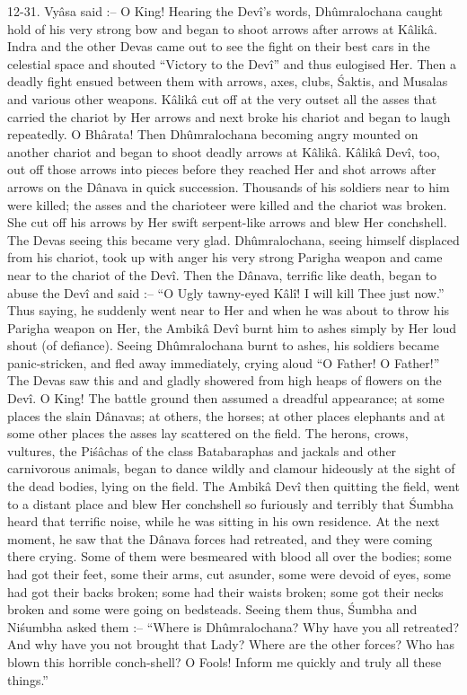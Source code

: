 12-31. Vy\^asa said :-- O King! Hearing the Dev\^i's words, Dh\^umralochana caught hold of his very strong bow and began to shoot arrows after arrows at K\^alik\^a. Indra and the other Devas came out to see the fight on their best cars in the celestial space and shouted ``Victory to the Dev\^i'' and thus eulogised Her. Then a deadly fight ensued between them with arrows, axes, clubs, \'Saktis, and Musalas and various other weapons. K\^alik\^a cut off at the very outset all the asses that carried the chariot by Her arrows and next broke his chariot and began to laugh repeatedly. O Bh\^arata! Then Dh\^umralochana becoming angry mounted on another chariot and began to shoot deadly arrows at K\^alik\^a. K\^alik\^a Dev\^i, too, out off those arrows into pieces before they reached Her and shot arrows after arrows on the D\^anava in quick succession. Thousands of his soldiers near to him were killed; the asses and the charioteer were killed and the chariot was broken. She cut off his arrows by Her swift serpent-like arrows and blew Her conchshell. The Devas seeing this became very glad. Dh\^umralochana, seeing himself displaced from his chariot, took up with anger his very strong Parigha weapon and came near to the chariot of the Dev\^i. Then the D\^anava, terrific like death, began to abuse the Dev\^i and said :-- ``O Ugly tawny-eyed K\^al\^i! I will kill Thee just now.'' Thus saying, he suddenly went near to Her and when he was about to throw his Parigha weapon on Her, the Ambik\^a Dev\^i burnt him to ashes simply by Her loud shout (of defiance). Seeing Dh\^umralochana burnt to ashes, his soldiers became panic-stricken, and fled away immediately, crying aloud ``O Father! O Father!'' The Devas saw this and and gladly showered from high heaps of flowers on the Dev\^i. O King! The battle ground then assumed a dreadful appearance; at some places the slain D\^anavas; at others, the horses; at other places elephants and at some other places the asses lay scattered on the field. The herons, crows, vultures, the Pi\'s\^achas of the class Batabaraphas and jackals and other carnivorous animals, began to dance wildly and clamour hideously at the sight of the dead bodies, lying on the field. The Ambik\^a Dev\^i then quitting the field, went to a distant place and blew Her conchshell so furiously and terribly that \'Sumbha heard that terrific noise, while he was sitting in his own residence. At the next moment, he saw that the D\^anava forces had retreated, and they were coming there crying. Some of them were besmeared with blood all over the bodies; some had got their feet, some their arms, cut asunder, some were devoid of eyes, some had got their backs broken; some had their waists broken; some got their necks broken and some were going on bedsteads. Seeing them thus, \'Sumbha and Ni\'sumbha asked them :-- ``Where is Dh\^umralochana? Why have you all retreated? And why have you not brought that Lady? Where are the other forces? Who has blown this horrible conch-shell? O Fools! Inform me quickly and truly all these things.''

